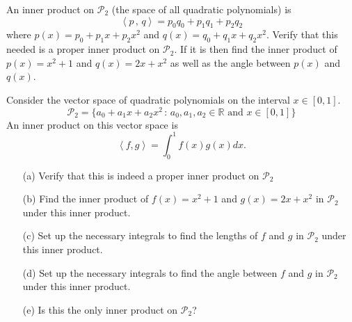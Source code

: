 \begin{problem}
    An inner product on $\mathcal{P}_2$ (the space of all quadratic polynomials) is 
    \[ \left< p \,,\, q \right> = p_0 q_0 + p_1 q_1 + p_2 q_2 \]
    where $p(x) = p_0 + p_1x + p_2 x^2$ and $q(x) = q_0 + q_1 x + q_2 x^2$.  Verify that
    this needed is a proper inner product on $\mathcal{P}_2$.  If it is then find the
    inner product of $p(x) = x^2 + 1$ and $q(x) = 2x+x^2$ as well as the angle between
    $p(x)$ and $q(x)$.
\end{problem}


\begin{problem}
    Consider the vector space of quadratic polynomials on the interval $x \in [0,1]$.
    \[ \mathcal{P}_2 = \{a_0 + a_1 x + a_2 x^2 \, : \, a_0, a_1, a_2 \in
        \mathbb{R} \text{ and } x \in [0,1] \} \]
    An inner product on this vector space is
    \[ \left< f,g\right> =
    \int_0^1 f(x) g(x) dx. \] 
    \begin{enumerate}
        \item[(a)] Verify that this is indeed a proper inner product on $\mathcal{P}_2$
        \item[(b)] Find the inner product of $f(x) = x^2+1$ and $g(x) =
            2x+x^2$ in $\mathcal{P}_2$ under this inner product.
        \item[(c)] Set up the necessary integrals to find the lengths of $f$ and $g$ in
            $\mathcal{P}_2$ under this inner product.
        \item[(d)] Set up the necessary integrals to find the angle between $f$ and $g$ in
            $\mathcal{P}_2$ under this inner product.
        \item[(e)] Is this the only inner product on $\mathcal{P}_2$?
    \end{enumerate}

\end{problem}


